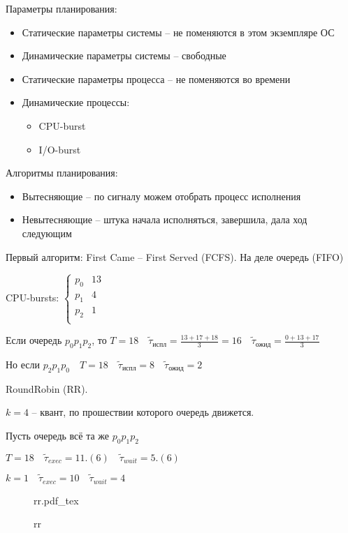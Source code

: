 \documentclass{book}
\theoremstyle{definition}
\newcommand{\incfig}[1]{%
    \def\svgwidth{\columnwidth}
    {#1.pdf_tex}
}
\newcommand{\tl}[1]{\widetilde{#1}}
\begin{document}
Параметры планирования:
\begin{itemize}
    \item Статические параметры системы -- не поменяются в этом экземпляре ОС
    \item Динамические параметры системы -- свободные
    \item Статические параметры процесса -- не поменяются во времени
    \item Динамические процессы:
        \begin{itemize}
            \item CPU-burst
            \item I/O-burst
        \end{itemize}
\end{itemize}
 
Алгоритмы планирования:
\begin{itemize}
    \item Вытесняющие -- по сигналу можем отобрать процесс исполнения
    \item Невытесняющие -- штука начала исполняться, завершила, дала ход следующим
\end{itemize}

Первый алгоритм:  First Came -- First Served (FCFS). На деле очередь (FIFO)

CPU-bursts:
$\begin{cases}
    p_0&13\\
    p_1&4\\
    p_2&1\\
\end{cases}$ 

Если очередь $p_0 p_1 p_2$, то $T = 18\quad \tl \tau_{\text{испл}} = \frac{13+17+18}{3} = 16\quad \tl \tau_{\text{ожид}} = \frac{0+13+17}{3}  $ 

Но если $p_2 p_1 p_0\quad T = 18\quad \tl \tau_{\text{испл}} = 8\quad \tl\tau_{\text{ожид}} = 2$

RoundRobin (RR). 

$k = 4$ -- квант, по прошествии которого очередь движется.

Пусть очередь всё та же  $p_0 p_1p_2$

$T = 18\quad \tl \tau_{exec} = 11.(6)\quad \tl \tau_{wait} = 5.(6)$

$k = 1\quad \tl \tau_{exec} = 10\quad \tl \tau_{wait} = 4$

\begin{figure}[!ht]
    \centering
    \incfig{rr}
    \caption{rr}
    \label{fig:rr}
\end{figure}
\end{document}
